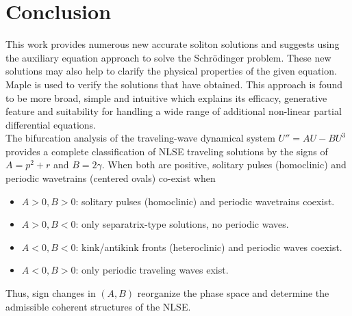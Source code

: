 \documentclass{article}
\numberwithin{equation}{section}
\begin{document}
\section{Conclusion}\label{s5}
\noindent This work provides numerous new accurate soliton solutions and suggests using the auxiliary equation approach to solve the Schr\"{o}dinger problem. These new solutions may also help to clarify the physical properties of the given equation. Maple is used to verify the solutions that have obtained. This approach is found to be more broad, simple and intuitive which explains its efficacy, generative feature and suitability for handling a wide range of additional non-linear partial differential equations.\\
The bifurcation analysis of the traveling-wave dynamical system $U'' = AU - BU^3$ provides a complete classification of NLSE traveling solutions by the signs of $A = p^2+r$ and $B=2\gamma$. When both are positive, solitary pulses (homoclinic) and periodic wavetrains (centered ovals) co-exist when
\begin{itemize}
    \item $A>0, B>0$: solitary pulses (homoclinic) and periodic wavetrains coexist.
    \item $A>0, B<0$: only separatrix-type solutions, no periodic waves.
    \item $A<0, B<0$: kink/antikink fronts (heteroclinic) and periodic waves coexist.
    \item $A<0, B>0$: only periodic traveling waves exist.
\end{itemize}
Thus, sign changes in $(A,B)$ reorganize the phase space and determine the admissible coherent structures of the NLSE.
\end{document}
